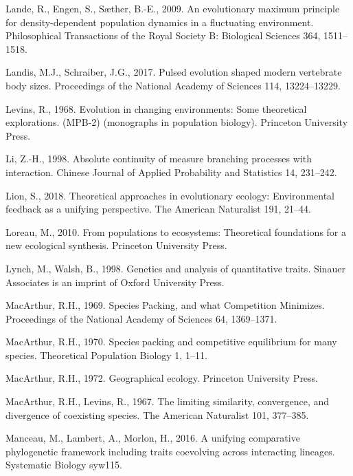 \documentclass[]{elsarticle} %
\begin{document}
\leavevmode\hypertarget{ref-Lande2009}{}%
Lande, R., Engen, S., Sæther, B.-E., 2009. An evolutionary maximum
principle for density-dependent population dynamics in a fluctuating
environment. Philosophical Transactions of the Royal Society B:
Biological Sciences 364, 1511--1518.

\leavevmode\hypertarget{ref-Landis2017}{}%
Landis, M.J., Schraiber, J.G., 2017. Pulsed evolution shaped modern
vertebrate body sizes. Proceedings of the National Academy of Sciences
114, 13224--13229.

\leavevmode\hypertarget{ref-9780691080628}{}%
Levins, R., 1968. Evolution in changing environments: Some theoretical
explorations. (MPB-2) (monographs in population biology). Princeton
University Press.

\leavevmode\hypertarget{ref-zeng1998absolute}{}%
Li, Z.-H., 1998. Absolute continuity of measure branching processes with
interaction. Chinese Journal of Applied Probability and Statistics 14,
231--242.

\leavevmode\hypertarget{ref-Lion2018}{}%
Lion, S., 2018. Theoretical approaches in evolutionary ecology:
Environmental feedback as a unifying perspective. The American
Naturalist 191, 21--44.

\leavevmode\hypertarget{ref-michelloreau2010}{}%
Loreau, M., 2010. From populations to ecosystems: Theoretical
foundations for a new ecological synthesis. Princeton University Press.

\leavevmode\hypertarget{ref-michaellynch1998}{}%
Lynch, M., Walsh, B., 1998. Genetics and analysis of quantitative
traits. Sinauer Associates is an imprint of Oxford University Press.

\leavevmode\hypertarget{ref-Arthur1969}{}%
MacArthur, R.H., 1969. Species Packing, and what Competition Minimizes.
Proceedings of the National Academy of Sciences 64, 1369--1371.

\leavevmode\hypertarget{ref-MacArthur1970}{}%
MacArthur, R.H., 1970. Species packing and competitive equilibrium for
many species. Theoretical Population Biology 1, 1--11.

\leavevmode\hypertarget{ref-9780691023823}{}%
MacArthur, R.H., 1972. Geographical ecology. Princeton University Press.

\leavevmode\hypertarget{ref-Macarthur1967}{}%
MacArthur, R.H., Levins, R., 1967. The limiting similarity, convergence,
and divergence of coexisting species. The American Naturalist 101,
377--385.

\leavevmode\hypertarget{ref-Manceau2016}{}%
Manceau, M., Lambert, A., Morlon, H., 2016. A unifying comparative
phylogenetic framework including traits coevolving across interacting
lineages. Systematic Biology syw115.
\end{document}
